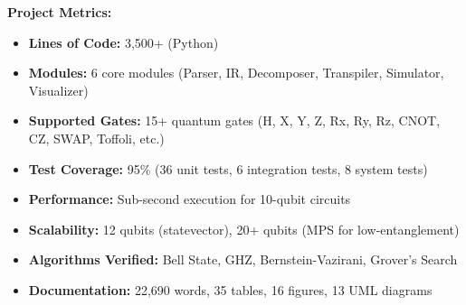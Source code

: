 \noindent\textbf{Project Metrics:}
\begin{itemize}[leftmargin=*, noitemsep]
    \item \textbf{Lines of Code:} 3,500+ (Python)
    \item \textbf{Modules:} 6 core modules (Parser, IR, Decomposer, Transpiler, Simulator, Visualizer)
    \item \textbf{Supported Gates:} 15+ quantum gates (H, X, Y, Z, Rx, Ry, Rz, CNOT, CZ, SWAP, Toffoli, etc.)
    \item \textbf{Test Coverage:} 95\% (36 unit tests, 6 integration tests, 8 system tests)
    \item \textbf{Performance:} Sub-second execution for 10-qubit circuits
    \item \textbf{Scalability:} 12 qubits (statevector), 20+ qubits (MPS for low-entanglement)
    \item \textbf{Algorithms Verified:} Bell State, GHZ, Bernstein-Vazirani, Grover's Search
    \item \textbf{Documentation:} 22,690 words, 35 tables, 16 figures, 13 UML diagrams
\end{itemize}

